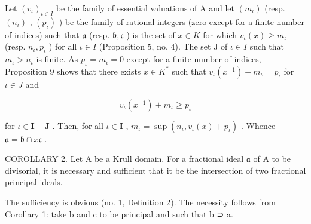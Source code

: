 Let \((v_{\iota})_{\iota \in I}\) be the family of essential valuations of A and let \((m_{\iota})\) (resp. \((n_{\iota})\) , \((p_{\iota})\) ) be the family of rational integers (zero except for a finite number of indices) such that \(\mathfrak{a}\) (resp. \(\mathfrak{b}, \mathfrak{c}\) ) is the set of \(x \in K\) for which \(v_{\iota}(x) \geqslant m_{\iota}\) (resp. \(n_{\iota}, p_{\iota}\) ) for all \(\iota \in I\) (Proposition 5, no. 4). The set J of \(\iota \in I\) such that \(m_{\iota} > n_{\iota}\) is finite. As \(p_{\iota} = m_{\iota} = 0\) except for a finite number of indices, Proposition 9 shows that there exists \(x \in K^{*}\) such that \(v_{\iota}(x^{-1}) + m_{\iota} = p_{\iota}\) for \(\iota \in J\) and

\[
v _ {\iota} (x ^ {- 1}) + m _ {\iota} \geqslant p _ {\iota}
\]

for \(\iota \in \mathbf{I} - \mathbf{J}\) . Then, for all \(\iota \in \mathbf{I}\) , \(m_{\iota} = \sup (n_{\iota}, v_{\iota}(x) + p_{\iota})\) . Whence \(\mathfrak{a} = \mathfrak{b} \cap x\mathfrak{c}\) .

COROLLARY 2. Let A be a Krull domain. For a fractional ideal \(\mathfrak{a}\) of A to be divisorial, it is necessary and sufficient that it be the intersection of two fractional principal ideals.

The sufficiency is obvious (no. 1, Definition 2). The necessity follows from Corollary 1: take b and c to be principal and such that b ⊃ a.

